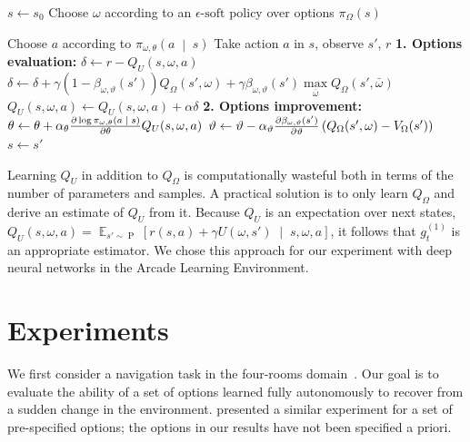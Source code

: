 \documentclass[letterpaper]{article}
\def\given{\;\middle\vert\;}
\DeclareMathOperator*{\expectation}{\mathbb{E}}
\DeclareMathOperator{\prob}{P}
\def\options{\Omega}
\def\option{\omega}
\def\termparams{\vartheta}
\begin{document}
\begin{algorithm}[h]
\DontPrintSemicolon
$s \leftarrow s_0$ \;
Choose $\option$ according to an $\epsilon\text{-soft}$ policy over options $\pi_\Omega(s)$\;

 {
Choose $a$ according to $\pi_{\option, \theta}\left( a \given s \right)$\;
Take action $a$ in $s$, observe $s'$, $r$\;
\;
\textbf{1. Options evaluation:}\;
$\delta \leftarrow r - Q_U(s, \option, a)$\;
{$\delta \leftarrow \delta + \gamma (1 - \beta_{\option, \termparams}(s'))Q_\options(s', \option) +
\gamma \beta_{\option, \termparams}(s') \max\limits_{\bar \option} Q_\options(s', \bar \option)$\;}
$Q_U(s, \option, a) \leftarrow Q_U(s, \option, a) + \alpha \delta$\;
\;
\textbf{2. Options improvement:}\;
$\theta \leftarrow \theta + \alpha_{\theta} \deriv[\log \pi_{\omega, \theta}\left( a \given s\right)]{\theta} Q_U(s, \option, a)$\;
$\vartheta \leftarrow \vartheta - \alpha_{\vartheta} \deriv[\beta_{\option, \vartheta}(s')]{\vartheta} \left( Q_\options(s', \option) - V_\options(s') \right)\;$\;
\;
$s \leftarrow s'$\;
}

\caption{Option-critic with tabular intra-option Q-learning}
\label{alg:oc-intraq}
\end{algorithm}

Learning  $Q_U$ in addition to $Q_\Omega$ is computationally wasteful both
in terms of the number of parameters and samples. A practical solution is to
only learn $Q_\Omega$ and  derive an estimate of $Q_U$ from it. Because $Q_U$ is
an expectation over next states, $Q_U(s, \option, a) = \expectation_{s' \sim \prob}\left[ r(s, a) + \gamma U(\omega, s')\given s, \option, a\right]$,
it follows that $g_t^{(1)}$ is an appropriate estimator. We chose
this approach for our experiment with deep neural networks in the Arcade Learning Environment.

 \section{Experiments}\label{sect:experiments}

We first consider a navigation task in the four-rooms domain~\cite{Sutton1999opt}.
Our goal is to  evaluate the ability of a set of options learned fully autonomously
 to recover from a sudden change in the environment. \cite{Sutton1999opt} presented a similar
experiment for a set of pre-specified options; the options in our results
have not been specified a priori.
\end{document}
